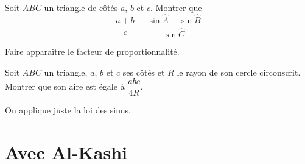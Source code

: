 \begin{exo}
Soit $ABC$ un triangle de côtés $a$, $b$ et $c$. Montrer que
\[ \frac{a+b}{c}=\frac{\sin \widehat A+\sin \widehat B}{\sin \widehat C}\]
\begin{hint}
Faire apparaître le facteur de proportionnalité.
\end{hint}
\begin{sol}
\end{sol}
\end{exo}


\begin{exo}
Soit $ABC$ un triangle, $a$, $b$ et $c$ ses côtés et $R$ le rayon de son cercle circonscrit.
Montrer que son aire est égale à $\dfrac{abc}{4R}$.
\begin{hint}
\end{hint}
\begin{sol}
On applique juste la loi des sinus.
\end{sol}
\end{exo}

\begin{exo}
\begin{hint}
\end{hint}
\begin{sol}
\end{sol}
\end{exo}

\begin{exo}
\begin{hint}
\end{hint}
\begin{sol}
\end{sol}
\end{exo}


\section{Avec Al-Kashi}

\begin{exo}
\begin{hint}
\end{hint}
\begin{sol}
\end{sol}
\end{exo}



\indications
\correction



